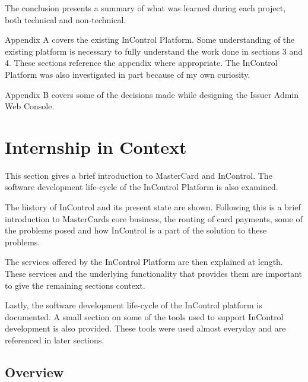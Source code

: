 \documentclass[a4paper, 11pt, titlepage]{article}
\begin{document}
The conclusion presents a summary of what was learned during each project, both technical and non-technical.

Appendix A covers the existing InControl Platform. Some understanding of the existing platform is necessary to fully understand the work done in sections 3 and 4. These sections reference the appendix where appropriate. The InControl Platform was also investigated in part because of my own curiosity.

Appendix B covers some of the decisions made while designing the Issuer Admin Web Console. 

\newpage
 
\section{Internship in Context}

This section gives a brief introduction to MasterCard and InControl. The software development life-cycle of the InControl Platform is also examined.

The history of InControl and its present state are shown. Following this is a brief introduction to MasterCards core business, the routing of card payments, some of the problems posed and how InControl is a part of the solution to these problems.

The services offered by the InControl Platform are then explained at length. These services and the underlying functionality that provides them are important to give the remaining sections context.

Lastly, the software development life-cycle of the InControl platform is documented. A small section on some of the tools used to support InControl development is also provided. These tools were used almost everyday and are referenced in later sections.

\subsection{Overview} 
\end{document}
